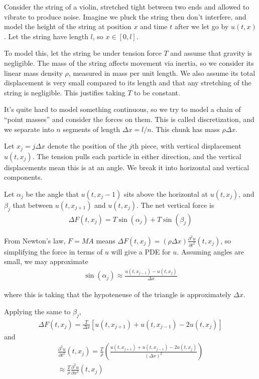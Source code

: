 \documentclass{article}
\newcommand{\pd}{\partial}
\begin{document}
	Consider the string of a violin, stretched tight between two ends and allowed to vibrate to produce noise. Imagine we pluck the string then don't interfere, and model the height of the string at position $x$ and time $t$ after we let go by $u(t,x)$. Let the string have length $l$, so $x \in [0,l]$. 
	
	To model this, let the string be under tension force $T$ and assume that gravity is negligible. The mass of the string affects movement via inertia, so we consider its linear mass density $\rho$, measured in mass per unit length. We also assume its total displacement is very small compared to its length and that any stretching of the string is negligible. This justifies taking $T$ to be constant.
	
	It's quite hard to model something continuous, so we try to model a chain of ``point masses'' and consider the forces on them. This is called discretization, and we separate into $n$ segments of length $\Delta x = l/n$.  This chunk has mass $\rho \Delta x$. 
	
	Let $x_j = j \Delta x$ denote the position of the $j$th piece, with vertical displacement $u(t,x_j)$. The tension pulls each particle in either direction, and the vertical displacements mean this is at an angle. We break it into horizontal and vertical components. 
	
	Let $\alpha_{j}$ be the angle that $u(t,x_j-1)$ sits above the horizontal at $u(t,x_j)$, and $\beta_j$ that between $u(t,x_{j+1})$ and $u(t,x_j)$. The net vertical force is 
	\begin{align*}
		\Delta F(t,x_j) = T \sin(\alpha_j) + T \sin(\beta_j)
	\end{align*}
	
	From Newton's law, $F = MA$ means $\Delta F(t,x_j) = (\rho \Delta x) \frac{\pd^{2} u}{\pd t^{2}}(t,x_j)$, so simplifying the force in terms of $u$ will give a PDE for $u$. Assuming angles are small, we may approximate  
	\begin{align*}
		\sin(\alpha_{j}) \approx \frac{u(t,x_{j-1}) - u(t,x_j)}{\Delta x}
	\end{align*}
	
	where this is taking that the hypoteneuse of the triangle is approximately $\Delta x$. 
	
	Applying the same to $\beta_j$,
	\begin{align*}
		\Delta F(t,x_j) = \frac{T}{\Delta x} \left[ u(t,x_{j+1}) + u(t,x_{j-1}) - 2u(t,x_j)\right]
	\end{align*}
	and 
	\begin{align*}
		\frac{\pd^{2} u}{\pd t^{2}}(t,x_j) = \frac{T}{\rho} \left( \frac{u(t,x_{j+1}) + u(t,x_{j-1}) - 2u(t,x_j)}{(\Delta x)^{2}} \right) \\
		\approx \frac{T}{\rho} \frac{\pd^{2}u}{\pd x^{2} }(t,x_j)
	\end{align*}
	
\end{document}
